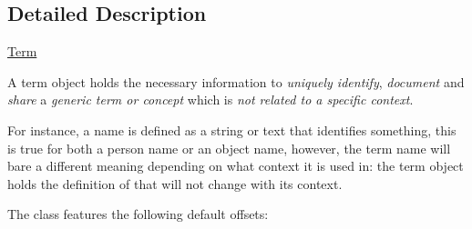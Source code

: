 \subsection{Detailed Description}
\hyperlink{class_ontology_wrapper_1_1_term}{Term}

A term object holds the necessary information to {\itshape uniquely identify}, {\itshape document} and {\itshape share} a {\itshape generic term or concept} which is {\itshape not related to a specific context}.

For instance, a {\ttfamily name} is defined as a string or text that identifies something, this is true for both a person name or an object name, however, the term {\ttfamily name} will bare a different meaning depending on what context it is used in\-: the term object holds the definition of that will not change with its context.

The class features the following default offsets\-:


